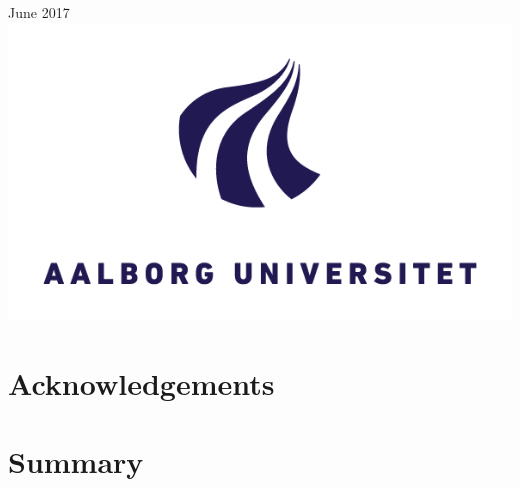 \documentclass[a4paper]{report}
\theoremstyle{plain}
\begin{document}
\begin{titlepage}


{\large June 2017}\\[2cm] %


\includegraphics{AAU_LOGO.png}\\[1cm] %
 

\vfill %

\end{titlepage}
\chapter*{Acknowledgements}


\chapter*{Summary}

\end{document}

